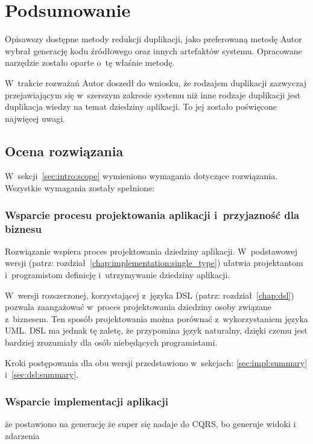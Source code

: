 \chapter{Podsumowanie} \label{chap:outro}

Opisawszy dostępne metody redukcji duplikacji, jako preferowaną metodę Autor wybrał generację kodu źródłowego oraz innych artefaktów systemu.
Opracowane narzędzie zostało oparte o~tę właśnie metodę.

W~trakcie rozważań Autor doszedł do wniosku, że rodzajem duplikacji zazwyczaj przejawiającym się w~szerszym zakresie systemu niż inne rodzaje duplikacji jest duplikacja wiedzy na temat dziedziny aplikacji.
To jej zostało poświęcone najwięcej uwagi.



\section{Ocena rozwiązania}

W~sekcji~\ref{sec:intro:scope} wymieniono wymagania dotyczące rozwiązania.
Wszystkie wymagania zostały spełnione:


\subsection{Wsparcie procesu projektowania aplikacji i~przyjazność dla biznesu}

Rozwiązanie wspiera proces projektowania dziedziny aplikacji.
W~podstawowej wersji (patrz: rozdział~\ref{chap:implementation:single_type}) ułatwia projektantom i~programistom definicję i~utrzymywanie dziedziny aplikacji.

W~wersji rozszerzonej, korzystającej z~języka DSL (patrz: rozdział~\ref{chap:dsl}) pozwala zaangażować w~proces projektowania dziedziny osoby związane z~biznesem.
Ten sposób projektowania można porównać z~wykorzystaniem języka UML.
DSL ma jednak tę zaletę, że przypomina język naturalny, dzięki czemu jest bardziej zrozumiały dla osób niebędących programistami.

Kroki postępowania dla obu wersji przedstawiono w~sekcjach: \ref{sec:impl:summary} i~\ref{sec:dsl:summary}.


\subsection{Wsparcie implementacji aplikacji}

że postawiono na generację
że super się nadaje do CQRS, bo generuje widoki i zdarzenia

